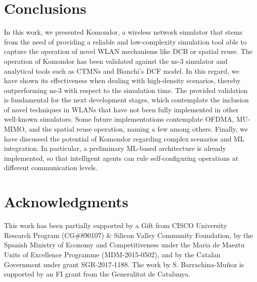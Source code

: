 \documentclass{article}
\begin{document}
	\section{Conclusions}
	\label{section:conclusions}
	In this work, we presented Komondor, a wireless network simulator that stems from the need of providing a reliable and low-complexity simulation tool able to capture the operation of novel WLAN mechanisms like DCB or spatial reuse. The operation of Komondor has been validated against the ns-3 simulator and analytical tools such as CTMNs and Bianchi's DCF model. In this regard, we have shown its effectiveness when dealing with high-density scenarios, thereby outperforming ns-3 with respect to the simulation time. The provided validation is fundamental for the next development stages, which contemplate the inclusion of novel techniques in WLANs that have not been fully implemented in other well-known simulators. Some future implementations contemplate OFDMA, MU-MIMO, and the spatial reuse operation, naming a few among others. Finally, we have discussed the potential of Komondor regarding complex scenarios and ML integration. In particular, a preliminary ML-based architecture is already implemented, so that intelligent agents can rule self-configuring operations at different communication levels.
	
	\section*{Acknowledgments}
	This work has been partially supported by a Gift from CISCO University Research Program (CG\#890107) \& Silicon Valley Community Foundation, by the Spanish Ministry of Economy and Competitiveness under the Maria de Maeztu Units of Excellence Programme (MDM-2015-0502), and by the Catalan Government under grant SGR-2017-1188. The work by S. Barrachina-Mu\~noz is supported by an FI grant from the Generalitat de Catalunya.
	
	
	
	
	\vspace{12pt}
	
\end{document}
